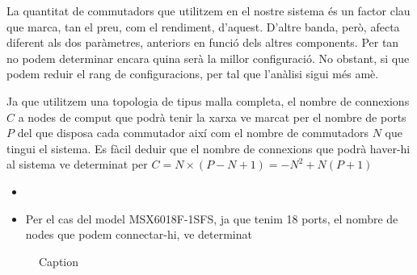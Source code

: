 La quantitat de commutadors que utilitzem en el nostre sistema és un factor clau que marca,
tan el preu, com el rendiment, d'aquest. D'altre banda, però, afecta diferent als dos paràmetres,
anteriors en funció dels altres components. Per tan no podem determinar encara quina serà la
millor configuració. No obstant, si que podem reduir el rang de configuracions, per tal que
l'anàlisi sigui més amè.

Ja que utilitzem una topologia de tipus malla completa, el nombre de connexions $C$ a nodes de comput
que podrà tenir la xarxa ve marcat per el nombre de ports $P$ del que disposa cada commutador així
com el nombre de commutadors $N$ que tingui el sistema. Es fàcil deduir que el nombre de connexions
que podrà haver-hi al sistema ve determinat per $C = N \times ( P - N + 1 ) = -N^2 + N(P+1)$
\begin{itemize}
  \item 
  \item Per el cas del model MSX6018F-1SFS, ja que tenim 18 ports, el nombre de nodes que
    podem connectar-hi, ve determinat
\end{itemize}

\begin{figure}
    \centering
    \caption{Caption}
    \label{fig:connections}
\end{figure}


